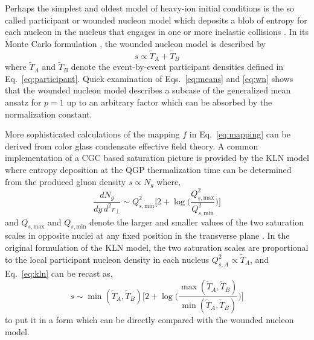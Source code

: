 \documentclass[aps,prc,reprint,amsmath,nofootinbib]{revtex4-1}
\newcommand{\T}{\tilde{T}}
\newcommand{\Qs}[1]{Q_{s,\text{#1}}}
\begin{document}
Perhaps the simplest and oldest model of heavy-ion initial conditions is the so called participant or wounded nucleon model which deposits a blob of entropy for each nucleon in the nucleus that engages in one or more inelastic collisions \cite{Bialas:1976ed}.
In its Monte Carlo formulation \cite{Shor:1988vk, Wang:1991hta, Alver:2008aq, Broniowski:2007nz}, the wounded nucleon model is described by
\begin{equation}
  s \propto \T_A + \T_B
  \label{eq:wn}
\end{equation}
where $\T_A$ and $\T_B$ denote the event-by-event participant densities defined in Eq.~\eqref{eq:participant}.
Quick examination of Eqs.~\eqref{eq:means} and \eqref{eq:wn} shows that the wounded nucleon model describes a subcase of the generalized mean ansatz for $p=1$ up to an arbitrary factor which can be absorbed by the normalization constant.

More sophisticated calculations of the mapping $f$ in Eq.~\eqref{eq:mapping} can be derived from color glass condensate effective field theory.
A common implementation of a CGC based saturation picture is provided by the KLN model \cite{Kharzeev:2001yq, Kharzeev:2002ei, Kharzeev:2004if} where entropy deposition at the QGP thermalization time can be determined from the produced gluon density $s \propto N_g$ where,
\begin{equation}
  \frac{dN_g}{dy\,d^2r_\perp} \sim \Qs{min}^2 \biggl[
    2 + \log \biggl(\frac{\Qs{max}^2}{\Qs{min}^2} \biggr)
  \biggr]
  \label{eq:kln}
\end{equation}
and $\Qs{max}$ and $\Qs{min}$ denote the larger and smaller values of the two saturation scales in opposite nuclei at any fixed position in the transverse plane \cite{Drescher:2006ca}.
In the original formulation of the KLN model, the two saturation scales are proportional to the local participant nucleon density in each nucleus $Q^2_{s,A} \propto \T_A$, and Eq.~\eqref{eq:kln} can be recast as,
\begin{equation}
  s \sim \min(\T_A, \T_B) \biggl[
    2 + \log \biggl(\frac{\max(\T_A,\T_B)}{\min(\T_A,\T_B)}\biggr)
  \biggr]
\end{equation}
to put it in a form which can be directly compared with the wounded nucleon model.
\end{document}
